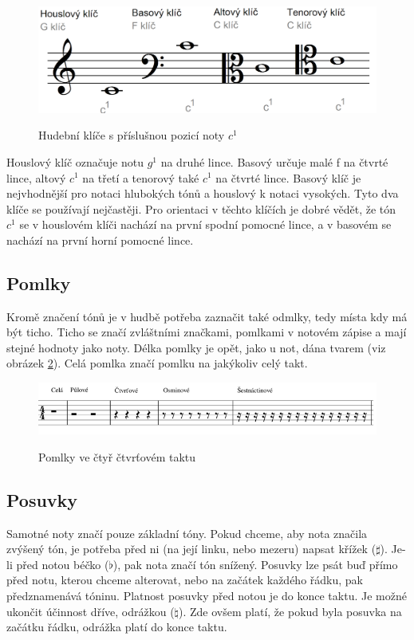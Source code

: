 \begin{figure}[h]\centering
    \centering
    \includegraphics[width=0.6\linewidth]{obrazky/Klíče.png}\\[1pt]  
    \caption{Hudební klíče s příslušnou pozicí noty $c^1$}    
    \label{obrazek4Klice}
\end{figure}

Houslový klíč označuje notu $g^1$ na druhé lince.
Basový určuje malé f na čtvrté lince, altový $c^1$ na třetí 
a tenorový také $c^1$ na čtvrté lince.
Basový klíč je nejvhodnější pro notaci hlubokých tónů 
a houslový k notaci vysokých.
Tyto dva klíče se používají nejčastěji. 
Pro orientaci v těchto klíčích je dobré vědět, že
tón $c^1$ se v houslovém klíči nachází na první spodní pomocné lince, 
a v basovém se nachází na první horní pomocné lince.
\cite{cmiral,zenkl}
\par

\subsection{Pomlky}
Kromě značení tónů je v hudbě potřeba zaznačit také odmlky,
tedy místa kdy má být ticho.
Ticho se značí zvláštními značkami, pomlkami v notovém zápise 
a mají stejné hodnoty jako noty.
Délka pomlky je opět, jako u not, 
dána tvarem (viz obrázek \ref{obrazekPomlky}).
Celá pomlka značí pomlku na jakýkoliv celý takt.
\cite{cmiral,zenkl}

\begin{figure}[h]\centering
    \centering
    \includegraphics[width=0.8\linewidth]{obrazky/pomlky.png}\\[1pt]  
    \caption{Pomlky ve čtyř čtvrťovém taktu}    
    \label{obrazekPomlky}
\end{figure}

\subsection{Posuvky}
\label{kapitolaPosuvky}
Samotné noty značí pouze základní tóny.
Pokud chceme, aby nota značila zvýšený tón, 
je potřeba před ni (na její linku, nebo mezeru) napsat křížek ($\sharp $).
Je-li před notou béčko ($\flat $), pak nota značí tón snížený.
Posuvky lze psát buď přímo před notu, kterou chceme alterovat, 
nebo na začátek každého řádku, pak předznamenává tóninu.
Platnost posuvky před notou je do konce taktu.
Je možné ukončit účinnost dříve, odrážkou ($\natural $).
Zde ovšem platí, že pokud byla posuvka na začátku řádku, 
odrážka platí do konce taktu.
\cite{cmiral,zenkl}

